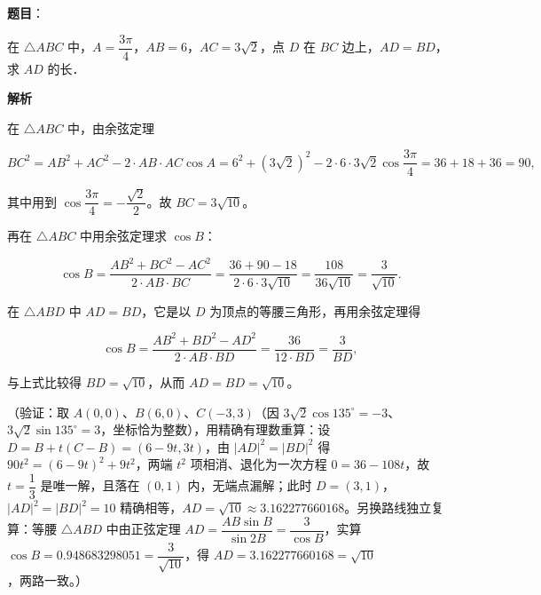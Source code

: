 \begin{answer}

\textbf{题目}：

在 \(\triangle ABC\) 中，\(A=\dfrac{3\pi}{4}\)，\(AB=6\)，\(AC=3\sqrt{2}\)，点 \(D\) 在 \(BC\) 边上，\(AD=BD\)，求 \(AD\) 的长．

\textbf{解析}

在 \(\triangle ABC\) 中，由余弦定理

\nopagebreak[4]
\[
BC^2=AB^2+AC^2-2\cdot AB\cdot AC\cos A=6^2+\left(3\sqrt{2}\right)^2-2\cdot 6\cdot 3\sqrt{2}\cos\dfrac{3\pi}{4}=36+18+36=90,
\]

其中用到 \(\cos\dfrac{3\pi}{4}=-\dfrac{\sqrt{2}}{2}\)。故 \(BC=3\sqrt{10}\)。

再在 \(\triangle ABC\) 中用余弦定理求 \(\cos B\)：

\nopagebreak[4]
\[
\cos B=\dfrac{AB^2+BC^2-AC^2}{2\cdot AB\cdot BC}=\dfrac{36+90-18}{2\cdot 6\cdot 3\sqrt{10}}=\dfrac{108}{36\sqrt{10}}=\dfrac{3}{\sqrt{10}} .
\]

在 \(\triangle ABD\) 中 \(AD=BD\)，它是以 \(D\) 为顶点的等腰三角形，再用余弦定理得

\nopagebreak[4]
\[
\cos B=\dfrac{AB^2+BD^2-AD^2}{2\cdot AB\cdot BD}=\dfrac{36}{12\cdot BD}=\dfrac{3}{BD},
\]

与上式比较得 \(BD=\sqrt{10}\)，从而 \(AD=BD=\sqrt{10}\)。

（验证：取 \(A(0,0)\)、\(B(6,0)\)、\(C(-3,3)\)（因 \(3\sqrt{2}\cos 135^\circ=-3\)、\(3\sqrt{2}\sin 135^\circ=3\)，坐标恰为整数），用精确有理数重算：设 \(D=B+t(C-B)=(6-9t,3t)\)，由 \(|AD|^2=|BD|^2\) 得 \(90t^2=(6-9t)^2+9t^2\)，两端 \(t^2\) 项相消、退化为一次方程 \(0=36-108t\)，故 \(t=\dfrac{1}{3}\) 是唯一解，且落在 \((0,1)\) 内，无端点漏解；此时 \(D=(3,1)\)，\(|AD|^2=|BD|^2=10\) 精确相等，\(AD=\sqrt{10}\approx3.162277660168\)。另换路线独立复算：等腰 \(\triangle ABD\) 中由正弦定理 \(AD=\dfrac{AB\sin B}{\sin 2B}=\dfrac{3}{\cos B}\)，实算 \(\cos B=0.948683298051=\dfrac{3}{\sqrt{10}}\)，得 \(AD=3.162277660168=\sqrt{10}\)，两路一致。）


\end{answer}
